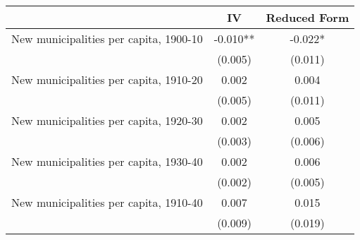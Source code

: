  \begin{tabular}{l*{2}{c}} \toprule
                &\multicolumn{1}{c}{IV}&\multicolumn{1}{c}{Reduced Form}\\
\midrule
New municipalities per capita, 1900-10&   -0.010** &   -0.022*  \\
                &  (0.005)   &  (0.011)   \\
\addlinespace
New municipalities per capita, 1910-20&    0.002   &    0.004   \\
                &  (0.005)   &  (0.011)   \\
\addlinespace
New municipalities per capita, 1920-30&    0.002   &    0.005   \\
                &  (0.003)   &  (0.006)   \\
\addlinespace
New municipalities per capita, 1930-40&    0.002   &    0.006   \\
                &  (0.002)   &  (0.005)   \\
\addlinespace
New municipalities per capita, 1910-40&    0.007   &    0.015   \\
                &  (0.009)   &  (0.019)   \\
 \bottomrule \end{tabular}
